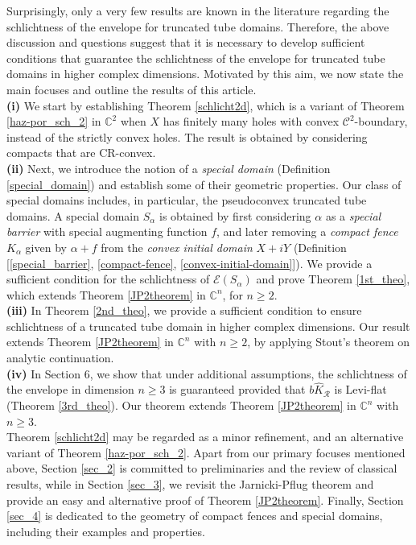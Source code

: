 \documentclass[12pt,reqno, a4paper]{amsart}
\theoremstyle{definition}
\theoremstyle{definition}
\numberwithin{equation}{section}
\def\C{\mathbb{C}}                              %
\begin{document}
Surprisingly, only a very few results are known in the literature regarding the schlichtness of the envelope for truncated tube domains. Therefore, the above discussion and questions suggest that it is necessary to develop sufficient conditions that guarantee the schlichtness of the envelope for truncated tube domains in higher complex dimensions. Motivated by this aim, we now state the main focuses and outline the results of this article.\\

	
\noindent\textbf{(i)} We start by establishing Theorem \ref{schlicht2d}, which is a variant of Theorem \ref{haz-por_sch_2} in $\C^2$ when $X$ has finitely many holes with convex $\mathcal{C}^2$-boundary, instead of the strictly convex holes. The result is obtained by considering compacts that are CR-convex.\\

\noindent \textbf{(ii)} Next, we introduce the notion of a \textit{special domain} (Definition \ref{special_domain}) and establish some of their geometric properties. Our class of special domains includes, in particular, the pseudoconvex truncated tube domains. A special domain $S_{\alpha}$ is obtained by first considering $\alpha$ as a \textit{special barrier} with special augmenting function $f$, and later removing a \textit{compact fence} $K_{\alpha}$ given by $\alpha+f$ from the \textit{convex initial domain} $X+iY$ (Definition [\ref{special_barrier}, \ref{compact-fence}, \ref{convex-initial-domain}]). We provide a sufficient condition for the schlichtness of $\mathcal{E}(S_{\alpha})$ and prove Theorem \ref{1st_theo}, which extends Theorem \ref{JP2theorem} in $\C^n$, for $n\geq 2.$\\

\noindent \textbf{(iii)} In Theorem \ref{2nd_theo}, we provide a sufficient condition to ensure schlichtness of a truncated tube domain in higher complex dimensions. Our result extends Theorem \ref{JP2theorem} in $\C^n$ with $n\geq 2$, by applying Stout's theorem on analytic continuation. \\

\noindent\textbf{(iv)}\label{part:iv} In Section 6, we show that under additional assumptions, the schlichtness of the envelope in dimension $n\geq 3$ is guaranteed provided that $b\widehat{K}_{\mathcal{R}}$ is Levi-flat (Theorem \ref{3rd_theo}). Our theorem extends Theorem \ref{JP2theorem} in $\C^n$ with $n\geq 3$.\\


Theorem \ref{schlicht2d} may be regarded as a minor refinement, and an alternative  variant of Theorem \ref{haz-por_sch_2}. Apart from our primary focuses mentioned above, Section \ref{sec_2} is committed to preliminaries and the review of classical results, while in Section \ref{sec_3}, we revisit the Jarnicki-Pflug theorem and provide an easy and alternative proof of Theorem \ref{JP2theorem}. Finally, Section \ref{sec_4} is dedicated to the geometry of compact fences and special domains, including their examples and properties.
\end{document}
